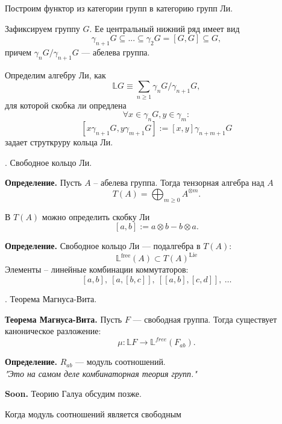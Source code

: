\documentclass[
 aps, pra,
 amsmath,amssymb,
 11pt,
 final,
tightenlines,
 twoside,
 twocolumn,
 nofloats,
nofootinbib,
 superscriptaddress,
showkeys,
showkeywords,
 ]
{revtex4-2}
\begin{document}
{Построим функтор из категории групп в категорию групп Ли.


Зафиксируем группу $G.$ Ее центральный нижний ряд имеет вид
$$
\gamma_{n+1}G \subseteq ... \subseteq \gamma_2G = [G, G] \subseteq G,
$$
причем $\gamma_n G / \gamma_{n+1}G$ --- абелева группа.

Определим алгебру Ли, как
$$
\mathbb{L} G \equiv \sum_{n \geq 1} \gamma_n G/ \gamma_{n+1}G,
$$
для которой скобка ли опредлена 
$$
\forall x \in \gamma_n G, y \in \gamma_m : 
$$
$$
[x\gamma_{n+1}G, y\gamma_{m+1}G] := [x, y] \gamma_{n+m+1}G 
$$
задает струткруру кольца Ли. 

\hrulefill

\begin{center}
{. Свободное кольцо Ли.}
\end{center}

{ \bf Определение. } Пусть $A$ -- абелева группа. Тогда тензорная алгебра над $A$
\[
T(A) = \bigoplus_{m \geq 0} A^{\otimes m}.
\]

В $T(A)$ можно определить скобку Ли
\[
[a, b] := a \otimes b - b \otimes a.
\]


{ \bf Определение. } Свободное кольцо Ли --- подалгебра в $T(A)$:
\[
\mathbb{L}^{\mathrm{free}}(A) \subset T(A)^{\mathrm{Lie}}
\]
Элементы -- линейные комбинации коммутаторов:
\[
[a,b],\ [a,[b,c]],\ [[a,b],[c,d]],\ \ldots
\]

\hrulefill 

\begin{center}
{. Теорема Магнуса-Вита.}
\end{center}

{ \bf Теорема Магнуса-Вита. } Пусть $F$ --- свободная группа. Тогда существует каноническое разложение:
\[
\mu: \mathbb{L}F \to \mathbb{L}^{free}(F_{ab}).
\]

{ \bf Определение. } $R_{ab}$ --- модуль соотношений. \\

{ \it "Это на самом деле комбинаторная теория групп."\\}

{ \bf Soon.}  Теорию Галуа обсудим позже.




\hrulefill

Когда модуль соотношений является свободным 


}
\end{document}
